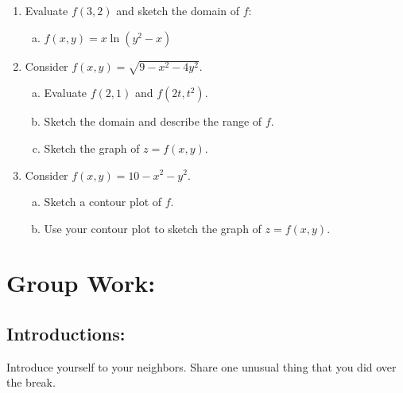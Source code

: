 \begin{enumerate}[{Example} 1: ]
\item Evaluate \(f(3,2)\) and sketch the domain of \(f\):
\begin{enumerate}[(a)]
\addtocounter{enumii}{1}

\item \(f(x,y) = x \ln(y^2-x)\) \vfill \vfill

\end{enumerate}

\pagebreak


\item Consider \(f(x,y)=\sqrt{9-x^2-4y^2}\).

\begin{enumerate}[(a)]

\item Evaluate \(f(2,1)\) and \(f(2t, t^2)\).\vfill

\item Sketch the domain and describe the range of \(f\). \vfill \vfill

\item Sketch the graph of \(z=f(x,y)\).\vfill \vfill



\end{enumerate}

\pagebreak


\item Consider \(f(x,y)=10-x^2-y^2\).

\begin{enumerate}[(a)]

\item Sketch a contour plot of \(f\).\vfill

\item Use your contour plot to sketch the graph of \(z=f(x,y)\).
\vfill

\end{enumerate}
\end{enumerate}

\section*{Group Work:}

\subsection*{Introductions:}

Introduce yourself to your neighbors. Share one unusual thing that you did over the break.


